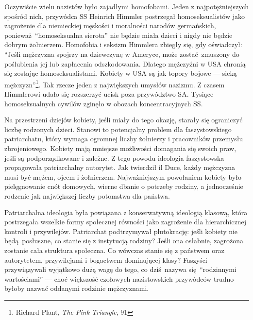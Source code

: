 \documentclass[12pt]{book}
\begin{document}
Oczywiście wielu nazistów było zajadłymi homofobami. Jeden z najpotężniejszych spośród nich, przywódca SS Heinrich Himmler postrzegał homoseksualistów jako zagrożenie dla niemieckiej męskości i moralności narodów germańskich, ponieważ ``homoseksualna sierota'' nie będzie miała dzieci i nigdy nie będzie dobrym żołnierzem. Homofobia i seksizm Himmlera zbiegły się, gdy oświadczył: ``Jeśli mężczyzna spojrzy na dziewczynę w Ameryce, może zostać zmuszony do poślubienia jej lub zapłacenia odszkodowania. Dlatego mężczyźni w USA chronią się zostając homoseksualistami. Kobiety w USA są jak topory bojowe — sieką mężczyzn''\footnote{Richard Plant, \textit{The Pink Triangle}, 91}. Tak rzecze jeden z największych umysłów nazizmu. Z czasem Himmlerowi udało się rozszerzyć ucisk poza przywództwo SA. Tysiące homoseksualnych cywilów zginęło w obozach koncentracyjnych SS.

Na przestrzeni dziejów kobiety, jeśli miały do tego okazję, starały się ograniczyć liczbę rodzonych dzieci. Stanowi to potencjalny problem dla faszystowskiego patriarchatu, który wymaga ogromnej liczby żołnierzy i pracowników przemysłu zbrojeniowego. Kobiety mają mniejsze możliwości domagania się swoich praw, jeśli są podporządkowane i zależne. Z tego powodu ideologia faszystowska propagowała patriarchalny autorytet. Jak twierdził il Duce, każdy mężczyzna musi być mężem, ojcem i żołnierzem. Najważniejszym powołaniem kobiety było pielęgnowanie cnót domowych, wierne dbanie o potrzeby rodziny, a jednocześnie rodzenie jak największej liczby potomstwa dla państwa.

Patriarchalna ideologia była powiązana z konserwatywną ideologią klasową, która postrzegała wszelkie formy społecznej równości jako zagrożenie dla hierarchicznej kontroli i przywilejów. Patriarchat podtrzymywał plutokrację: jeśli kobiety nie będą posłuszne, co stanie się z instytucją rodziny? Jeśli ona osłabnie, zagrożona zostanie cała struktura społeczna. Co wówczas stanie się z państwem oraz autorytetem, przywilejami i bogactwem dominującej klasy? Faszyści przywiązywali wyjątkowo dużą wagę do tego, co dziś nazywa się ``rodzinnymi wartościami'' — choć większość czołowych nazistowskich przywódców trudno byłoby nazwać oddanymi rodzinie mężczyznami.
\end{document}
